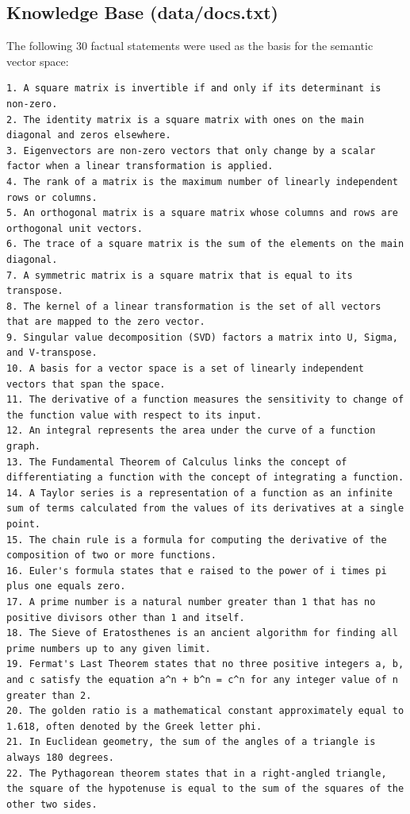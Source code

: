 \documentclass[12pt,a4paper]{article}
\begin{document}
\subsection{Knowledge Base (data/docs.txt)}
The following 30 factual statements were used as the basis for the semantic vector space:

\begin{lstlisting}[basicstyle=\ttfamily\scriptsize]
1. A square matrix is invertible if and only if its determinant is non-zero.
2. The identity matrix is a square matrix with ones on the main diagonal and zeros elsewhere.
3. Eigenvectors are non-zero vectors that only change by a scalar factor when a linear transformation is applied.
4. The rank of a matrix is the maximum number of linearly independent rows or columns.
5. An orthogonal matrix is a square matrix whose columns and rows are orthogonal unit vectors.
6. The trace of a square matrix is the sum of the elements on the main diagonal.
7. A symmetric matrix is a square matrix that is equal to its transpose.
8. The kernel of a linear transformation is the set of all vectors that are mapped to the zero vector.
9. Singular value decomposition (SVD) factors a matrix into U, Sigma, and V-transpose.
10. A basis for a vector space is a set of linearly independent vectors that span the space.
11. The derivative of a function measures the sensitivity to change of the function value with respect to its input.
12. An integral represents the area under the curve of a function graph.
13. The Fundamental Theorem of Calculus links the concept of differentiating a function with the concept of integrating a function.
14. A Taylor series is a representation of a function as an infinite sum of terms calculated from the values of its derivatives at a single point.
15. The chain rule is a formula for computing the derivative of the composition of two or more functions.
16. Euler's formula states that e raised to the power of i times pi plus one equals zero.
17. A prime number is a natural number greater than 1 that has no positive divisors other than 1 and itself.
18. The Sieve of Eratosthenes is an ancient algorithm for finding all prime numbers up to any given limit.
19. Fermat's Last Theorem states that no three positive integers a, b, and c satisfy the equation a^n + b^n = c^n for any integer value of n greater than 2.
20. The golden ratio is a mathematical constant approximately equal to 1.618, often denoted by the Greek letter phi.
21. In Euclidean geometry, the sum of the angles of a triangle is always 180 degrees.
22. The Pythagorean theorem states that in a right-angled triangle, the square of the hypotenuse is equal to the sum of the squares of the other two sides.

\end{lstlisting}
\end{document}
